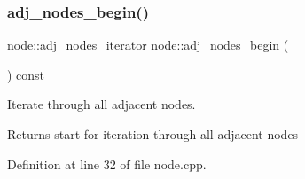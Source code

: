 \mbox{\label{classnode_a6cd2febf910bc6572c4aecba6278b100}} 
\subsubsection{\texorpdfstring{adj\+\_\+nodes\+\_\+begin()}{adj\_nodes\_begin()}}
{\footnotesize\ttfamily \mbox{\hyperlink{classnode_a392f19ea6dfa344bdf5c4d5a4b25eb8c}{node\+::adj\+\_\+nodes\+\_\+iterator}} node\+::adj\+\_\+nodes\+\_\+begin (\begin{DoxyParamCaption}{ }\end{DoxyParamCaption}) const}

Iterate through all adjacent nodes.

\begin{DoxyReturn}{Returns}
start for iteration through all adjacent nodes 
\end{DoxyReturn}


Definition at line 32 of file node.\+cpp.


